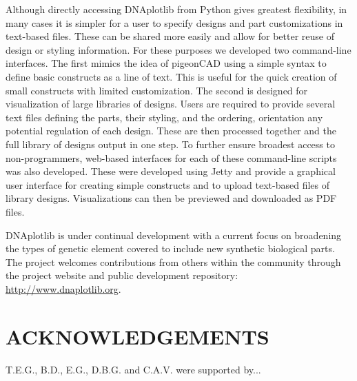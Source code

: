 \documentclass{bioinfo}
\begin{document}
Although directly accessing DNAplotlib from Python gives greatest flexibility, in many cases it is simpler for a user to specify designs and part customizations in text-based files. These can be shared more easily and allow for better reuse of design or styling information. For these purposes we developed two command-line interfaces. The first mimics the idea of pigeonCAD using a simple syntax to define basic constructs as a line of text. This is useful for the quick creation of small constructs with limited customization. The second is designed for visualization of large libraries of designs. Users are required to provide several text files defining the parts, their styling, and the ordering, orientation any potential regulation of each design. These are then processed together and the full library of designs output in one step. To further ensure broadest access to non-programmers, web-based interfaces for each of these command-line scripts was also developed. These were developed using Jetty and provide a graphical user interface for creating simple constructs and to upload text-based files of library designs. Visualizations can then be previewed and downloaded as PDF files.

DNAplotlib is under continual development with a current focus on broadening the types of genetic element covered to include new synthetic biological parts. The project welcomes contributions from others within the community through the project website and public development repository: \href{http://www.dnaplotlib.org}{http://www.dnaplotlib.org}.

\section*{ACKNOWLEDGEMENTS}
T.E.G., B.D., E.G., D.B.G. and C.A.V. were supported by...
\end{document}
